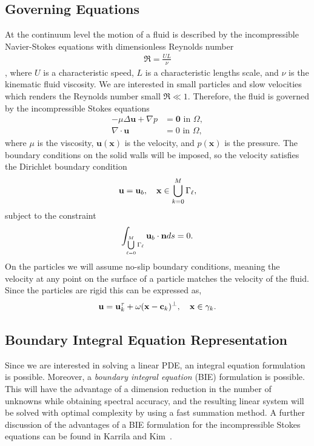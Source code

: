 \documentclass[preprint, 10pt]{elsarticle}
\begin{document}
\subsection{Governing Equations}\label{sec:governing}
At the continuum level the motion of a fluid is described by the
incompressible Navier-Stokes equations with dimensionless Reynolds
number
\begin{align*}
  \Re = \frac{UL}{\nu}
\end{align*},
where $U$ is a characteristic speed, $L$ is a characteristic lengths
scale, and $\nu$ is the kinematic fluid viscosity.  We are interested in
small particles and slow velocities which renders the Reynolds number
small $\Re \ll 1$.  Therefore, the fluid is governed by the
incompressible Stokes equations
\begin{subequations}\label{eq:stokes}
\begin{align}
  -\mu\Delta \mathbf{u} + \nabla p &= \mathbf{0} \text{ in }\Omega,\\	  
  \nabla\cdot\mathbf{u} &= 0 \text{ in }\Omega,
\end{align}
\end{subequations}
where $\mu$ is the viscosity, $\mathbf{u}(\mathbf{x})$ is the velocity,
and $p(\mathbf{x})$ is the pressure.  The boundary conditions on the
solid walls will be imposed, so the velocity satisfies the Dirichlet
boundary condition
\begin{align}
  \label{eq:boundary_condition}
  \mathbf{u} = \mathbf{u}_b, \quad {\mathbf{x}} \in 
    \bigcup\limits_{k=0}^M \Gamma_\ell,
\end{align}
subject to the constraint 
\begin{align}
  \label{eq:compatibility}
  \int_{\bigcup\limits_{\ell=0}^M\Gamma_\ell} {\mathbf{u}}_b\cdot{\mathbf{n}} ds = 0.
\end{align}
On the particles we will assume no-slip boundary conditions, meaning the
velocity at any point on the surface of a particle matches the velocity
of the fluid.  Since the particles are rigid this can be expressed as,
\begin{align*}
  {\mathbf{u}} = {\mathbf{u}}^\tau_k + \omega({\mathbf{x}}-{\mathbf{c}}_k)^\perp, \quad {\mathbf{x}} \in \gamma_k.
\end{align*}



\subsection{Boundary Integral Equation Representation}
Since we are interested in solving a linear PDE, an integral equation
formulation is possible.  Moreover, a {\em boundary integral equation}
(BIE) formulation is possible.  This will have the advantage of a dimension
reduction in the number of unknowns while obtaining spectral accuracy,
and the resulting linear system will be solved with optimal complexity
by using a fast summation method.  A further discussion of the
advantages of a BIE formulation for the incompressible Stokes equations
can be found in Karrila and Kim~\cite{Karrila1989}.
\end{document}
